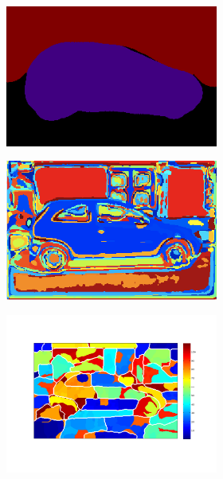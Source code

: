\documentclass{article} %
\begin{document}
\begin{figure}
\begin{subfigure}[c]{\textwidth}
\begin{subfigure}[c]{0.195\textwidth}
		\end{subfigure}
		\begin{subfigure}[c]{0.195\textwidth}
			\includegraphics[width = \textwidth]{./img/7_8_s_GT.png}
			\label{fig:7_8_s_lab}
		\end{subfigure}
		\begin{subfigure}[c]{0.195\textwidth}
			\includegraphics[width = \textwidth]{./img/7_8_s_map.png}
			\label{fig:7_8_s_map}
		\end{subfigure}
		\begin{subfigure}[]{0.195\textwidth}
			\includegraphics[width = \textwidth]{./img/su7_8_s.pdf}

\end{subfigure}
\end{subfigure}
\end{figure}
\end{document}
